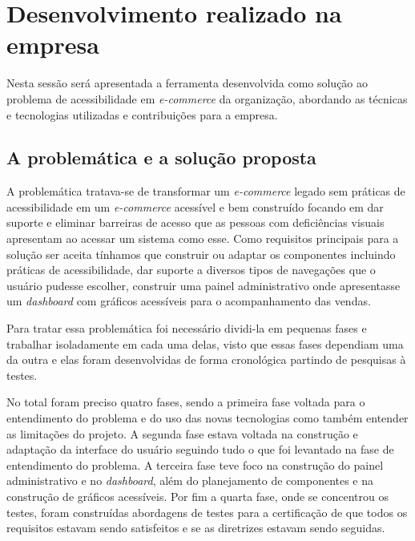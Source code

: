 \section{Desenvolvimento realizado na empresa}
\label{sec:desenvolvimento}

{Nesta sessão será apresentada a ferramenta desenvolvida como solução ao problema de acessibilidade em  \textit{e-commerce} da organização, abordando as técnicas e tecnologias utilizadas e contribuições para a empresa.}

\subsection{A problemática e a solução proposta}

{A problemática tratava-se de transformar um \textit{e-commerce} legado sem práticas de acessibilidade em um \textit{e-commerce} acessível e bem construído focando em dar suporte e eliminar barreiras de acesso que as pessoas com deficiências visuais apresentam ao acessar um sistema como esse. Como requisitos principais para a solução ser aceita tínhamos que construir ou adaptar os componentes incluindo práticas de acessibilidade, dar suporte a diversos tipos de navegações que o usuário pudesse escolher, construir uma painel administrativo onde apresentasse um \textit{dashboard} com gráficos acessíveis para o acompanhamento das vendas.

Para tratar essa problemática foi necessário dividi-la em pequenas fases e trabalhar isoladamente em cada uma delas, visto que essas fases dependiam uma da outra e elas foram desenvolvidas de forma cronológica partindo de pesquisas à testes. 

No total foram preciso quatro fases, sendo a primeira fase voltada para o entendimento do problema e do uso das novas tecnologias como também entender as limitações do projeto. A segunda fase estava voltada na construção e adaptação da interface do usuário seguindo tudo o que foi levantado na fase de entendimento do problema. A terceira fase teve foco na construção do painel administrativo e no \textit{dashboard}, além do planejamento de componentes e na construção de gráficos acessíveis. Por fim a quarta fase, onde se concentrou os testes, foram construídas abordagens de testes para a certificação de que todos os requisitos estavam sendo satisfeitos e se as diretrizes estavam sendo seguidas.

}

